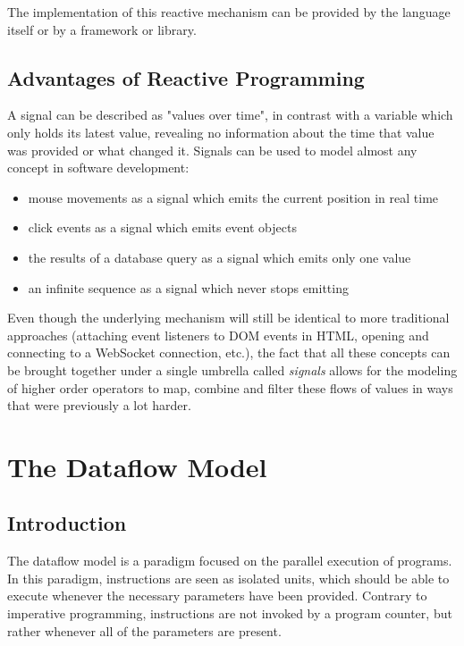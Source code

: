 The implementation of this reactive mechanism can be provided by the language itself or by a framework or library. 

\subsection{Advantages of Reactive Programming}

A signal can be described as "values over time", in contrast with a variable which only holds its latest value, revealing no information about the time that value was provided or what changed it. 
Signals can be used to model almost any concept in software development:
\begin{itemize}
	\item mouse movements as a signal which emits the current position in real time
	\item click events as a signal which emits event objects
	\item the results of a database query as a signal which emits only one value
    \item an infinite sequence as a signal which never stops emitting
\end{itemize}

Even though the underlying mechanism will still be identical to more traditional approaches (attaching event listeners to DOM events in HTML, opening and connecting to a WebSocket connection, etc.), the fact that all these concepts can be brought together under a single umbrella called \textit{signals} allows for the modeling of higher order operators to map, combine and filter these flows of values in ways that were previously a lot harder.

\section{The Dataflow Model}

\subsection{Introduction}

The dataflow model \citep{johnston_advances_2004} is a paradigm focused on the parallel execution of programs. In this paradigm, instructions are seen as isolated units, which should be able to execute whenever the necessary parameters have been provided. Contrary to imperative programming, instructions are not invoked by a program counter, but rather whenever all of the parameters are present. 

